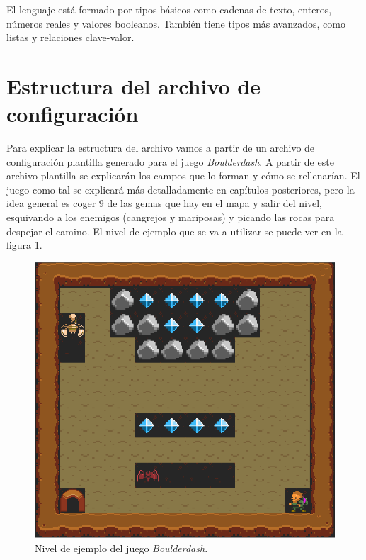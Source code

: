 El lenguaje está formado por tipos básicos como cadenas de texto, enteros, números reales y valores
booleanos. También tiene tipos más avanzados, como listas y relaciones clave-valor.

\section{Estructura del archivo de configuración}

Para explicar la estructura del archivo vamos a partir de un archivo de configuración plantilla
generado para el juego \textit{Boulderdash}. A partir de este archivo plantilla se explicarán los campos
que lo forman y cómo se rellenarían. El juego como tal se explicará más detalladamente en capítulos
posteriores, pero la idea general es coger 9 de las gemas que hay en el mapa y salir del
nivel, esquivando a los enemigos (cangrejos y mariposas) y picando las rocas para despejar el camino.
El nivel de ejemplo que se va a utilizar se puede ver en la figura \ref{fig:boulderdash-example}.

\begin{figure}[H]
    \centering
    \includegraphics[scale=0.4]{img/CH06/boulderdash.png}
    \caption{Nivel de ejemplo del juego \textit{Boulderdash}.}
    \label{fig:boulderdash-example}
\end{figure}

